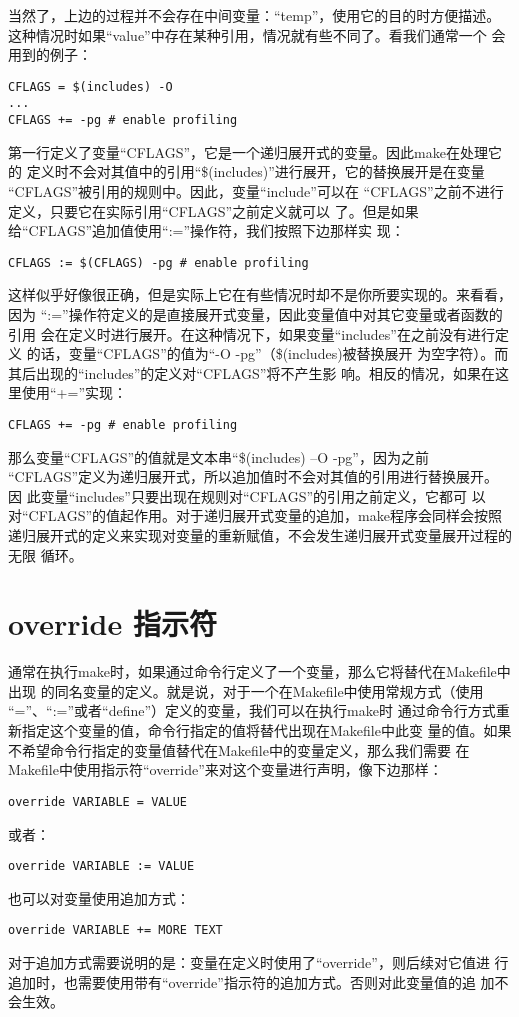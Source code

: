 当然了，上边的过程并不会存在中间变量：“temp”，使用它的目的时方便描述。
这种情况时如果“value”中存在某种引用，情况就有些不同了。看我们通常一个
会用到的例子：
\begin{Verbatim}[]
CFLAGS = $(includes) -O
...
CFLAGS += -pg # enable profiling
\end{Verbatim}

第一行定义了变量“CFLAGS”，它是一个递归展开式的变量。因此make在处理它的
定义时不会对其值中的引用“\$(includes)”进行展开，它的替换展开是在变量
“CFLAGS”被引用的规则中。因此，变量“include”可以在
“CFLAGS”之前不进行定义，只要它在实际引用“CFLAGS”之前定义就可以
了。但是如果给“CFLAGS”追加值使用“:=”操作符，我们按照下边那样实
现：
\begin{Verbatim}[]
CFLAGS := $(CFLAGS) -pg # enable profiling
\end{Verbatim}

这样似乎好像很正确，但是实际上它在有些情况时却不是你所要实现的。来看看，因为
“:=”操作符定义的是直接展开式变量，因此变量值中对其它变量或者函数的引用
会在定义时进行展开。在这种情况下，如果变量“includes”在之前没有进行定义
的话，变量“CFLAGS”的值为“-O -pg”（\$(includes)被替换展开
为空字符）。而其后出现的“includes”的定义对“CFLAGS”将不产生影
响。相反的情况，如果在这里使用“+=”实现：
\begin{Verbatim}[]
CFLAGS += -pg # enable profiling
\end{Verbatim}
那么变量“CFLAGS”的值就是文本串“\$(includes) –O -pg”，因为之前
“CFLAGS”定义为递归展开式，所以追加值时不会对其值的引用进行替换展开。因
此变量“includes”只要出现在规则对“CFLAGS”的引用之前定义，它都可
以对“CFLAGS”的值起作用。对于递归展开式变量的追加，make程序会同样会按照
递归展开式的定义来实现对变量的重新赋值，不会发生递归展开式变量展开过程的无限
循环。

\section{override 指示符}
通常在执行make时，如果通过命令行定义了一个变量，那么它将替代在Makefile中出现
的同名变量的定义。就是说，对于一个在Makefile中使用常规方式（使用
“=”、“:=”或者“define”）定义的变量，我们可以在执行make时
通过命令行方式重新指定这个变量的值，命令行指定的值将替代出现在Makefile中此变
量的值。如果不希望命令行指定的变量值替代在Makefile中的变量定义，那么我们需要
在Makefile中使用指示符“override”来对这个变量进行声明，像下边那样：
\begin{Verbatim}[]
override VARIABLE = VALUE
\end{Verbatim}
\noindent 或者：
\begin{Verbatim}[]
override VARIABLE := VALUE
\end{Verbatim}
\noindent 也可以对变量使用追加方式：
\begin{Verbatim}[]
override VARIABLE += MORE TEXT
\end{Verbatim}
对于追加方式需要说明的是：变量在定义时使用了“override”，则后续对它值进
行追加时，也需要使用带有“override”指示符的追加方式。否则对此变量值的追
加不会生效。

